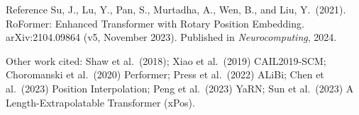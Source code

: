 \documentclass[aspectratio=169,11pt]{beamer}
\begin{document}
\begin{frame}{Reference}
  \small
  Su, J., Lu, Y., Pan, S., Murtadha, A., Wen, B., and Liu, Y.\ (2021). RoFormer: Enhanced Transformer with Rotary Position Embedding. arXiv:2104.09864 (v5, November 2023). Published in \emph{Neurocomputing}, 2024.
  \vspace{3mm}

  {\footnotesize Other work cited: Shaw et al.\ (2018); Xiao et al.\ (2019) CAIL2019-SCM; Choromanski et al.\ (2020) Performer; Press et al.\ (2022) ALiBi; Chen et al.\ (2023) Position Interpolation; Peng et al.\ (2023) YaRN; Sun et al.\ (2023) A Length-Extrapolatable Transformer (xPos).}
\end{frame}
\end{document}
